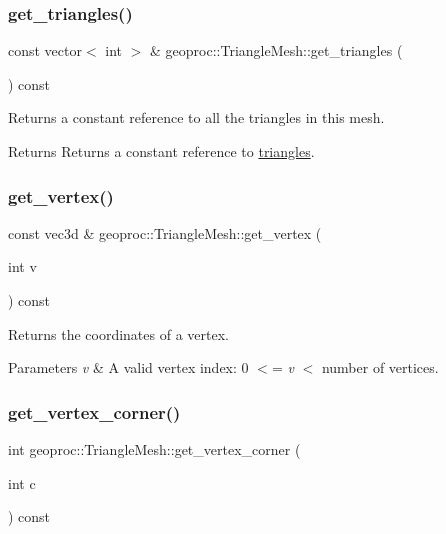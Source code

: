 \subsubsection{\texorpdfstring{get\+\_\+triangles()}{get\_triangles()}}
{\footnotesize\ttfamily const vector$<$ int $>$ \& geoproc\+::\+Triangle\+Mesh\+::get\+\_\+triangles (\begin{DoxyParamCaption}{ }\end{DoxyParamCaption}) const}



Returns a constant reference to all the triangles in this mesh. 

\begin{DoxyReturn}{Returns}
Returns a constant reference to \hyperlink{classgeoproc_1_1TriangleMesh_ad1cf20622f2bb080100862f413bd89c2}{triangles}. 
\end{DoxyReturn}
\mbox{\label{classgeoproc_1_1TriangleMesh_adc5168f8557856f574bc1c3533550b3e}} 
\subsubsection{\texorpdfstring{get\+\_\+vertex()}{get\_vertex()}}
{\footnotesize\ttfamily const vec3d \& geoproc\+::\+Triangle\+Mesh\+::get\+\_\+vertex (\begin{DoxyParamCaption}\item[{int}]{v }\end{DoxyParamCaption}) const}



Returns the coordinates of a vertex. 


\begin{DoxyParams}{Parameters}
{\em v} & A valid vertex index\+: 0 $<$= {\itshape v} $<$ number of vertices. \\
\hline
\end{DoxyParams}
\mbox{\label{classgeoproc_1_1TriangleMesh_aba03ea01f69c0888e0aae17ec330d31d}} 
\subsubsection{\texorpdfstring{get\+\_\+vertex\+\_\+corner()}{get\_vertex\_corner()}}
{\footnotesize\ttfamily int geoproc\+::\+Triangle\+Mesh\+::get\+\_\+vertex\+\_\+corner (\begin{DoxyParamCaption}\item[{int}]{c }\end{DoxyParamCaption}) const}



